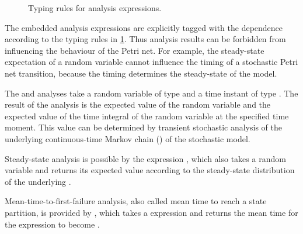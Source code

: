 \begin{figure}
  \caption{Typing rules for analysis expressions.}
  \label{fig:rgspn:analysis-typing}
\end{figure}

The embedded analysis expressions are explicitly tagged with the  dependence according to the typing rules in \cref{fig:rgspn:analysis-typing}. Thus analysis results can be forbidden from influencing the behaviour of the Petri net. For example, the steady-state expectation of a random variable cannot influence the timing of a stochastic Petri net transition, because the timing determines the steady-state of the model.

The  and  analyses take a random variable of type  and a time instant of type . The result of the analysis is the expected value of the random variable and the expected value of the time integral of the random variable at the specified time moment. This value can be determined by transient stochastic analysis of the underlying continuous-time Markov chain () of the stochastic model.

Steady-state analysis is possible by the expression , which also takes a  random variable and returns its expected value according to the steady-state distribution of the underlying .

Mean-time-to-first-failure analysis, also called mean time to reach a state partition, is provided by , which takes a  expression and returns the mean time for the expression to become .

